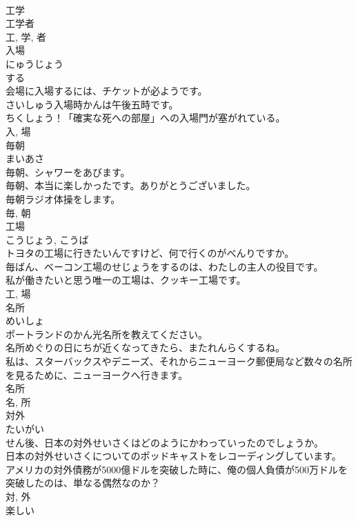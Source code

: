 \documentclass[8pt]{extreport}
\begin{document}
\begin{CJK}{UTF8}{min}
\\	工学 
\\	工学者 
\\	工, 学, 者	
\\	入場	
\\	にゅうじょう	
\\	する 
\\	会場に入場するには、チケットが必ようです。	
\\	さいしゅう入場時かんは午後五時です。	
\\	ちくしょう！「確実な死への部屋」への入場門が塞がれている。	
\\	入, 場	
\\	毎朝	
\\	まいあさ	
\\	毎朝、シャワーをあびます。	
\\	毎朝、本当に楽しかったです。ありがとうございました。	
\\	毎朝ラジオ体操をします。	
\\	毎, 朝	
\\	工場	
\\	こうじょう, こうば	
\\	トヨタの工場に行きたいんですけど、何で行くのがべんりですか。	
\\	毎ばん、ベーコン工場のせじょうをするのは、わたしの主人の役目です。	
\\	私が働きたいと思う唯一の工場は、クッキー工場です。	
\\	工, 場	
\\	名所	
\\	めいしょ	
\\	ポートランドのかん光名所を教えてください。	
\\	名所めぐりの日にちが近くなってきたら、またれんらくするね。	
\\	私は、スターバックスやデニーズ、それからニューヨーク郵便局など数々の名所を見るために、ニューヨークへ行きます。	
\\	名所 
\\	名, 所	
\\	対外	
\\	たいがい	
\\	せん後、日本の対外せいさくはどのようにかわっていったのでしょうか。	
\\	日本の対外せいさくについてのポッドキャストをレコーディングしています。	
\\	アメリカの対外債務が5000億ドルを突破した時に、俺の個人負債が500万ドルを突破したのは、単なる偶然なのか？	
\\	対, 外	
\\	楽しい	

\end{CJK}
\end{document}
